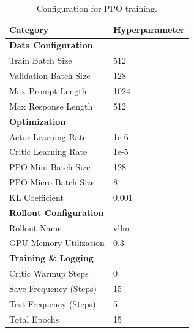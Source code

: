 \begin{table}[ht]
\centering
\small
\begin{tabular}{ll}
\toprule
\textbf{Category} & \textbf{Hyperparameter} \\
\midrule
\multicolumn{2}{l}{\textbf{Data Configuration}} \\
\midrule
Train Batch Size & 512 \\
Validation Batch Size & 128 \\
Max Prompt Length & 1024 \\
Max Response Length & 512 \\
\midrule
\multicolumn{2}{l}{\textbf{Optimization}} \\
\midrule
Actor Learning Rate & 1e-6 \\
Critic Learning Rate & 1e-5 \\
PPO Mini Batch Size & 128 \\
PPO Micro Batch Size & 8 \\
KL Coefficient & 0.001 \\
\midrule
\multicolumn{2}{l}{\textbf{Rollout Configuration}} \\
\midrule
Rollout Name & vllm \\
GPU Memory Utilization & 0.3 \\
\midrule
\multicolumn{2}{l}{\textbf{Training \& Logging}} \\
\midrule
Critic Warmup Steps & 0 \\
Save Frequency (Steps) & 15 \\
Test Frequency (Steps) & 5 \\
Total Epochs & 15 \\
\bottomrule
\end{tabular}
\caption{Configuration for PPO training.}
\label{tab:training_hparams2}
\end{table}

